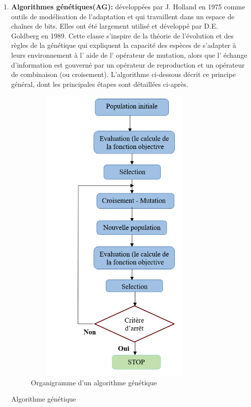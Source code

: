 \begin{enumerate}[label=\alph*)]
	\item \textbf{Algorithmes génétiques(AG):} développées par J. Holland en 1975 comme outils de modélisation de l’adaptation et qui travaillent dans un espace de chaînes de bits. Elles ont été largement utilisé et développé par D.E. Goldberg en 1989. Cette classe s’inspire de la théorie de l’évolution et des règles de la génétique qui expliquent la capacité des espèces de s’adapter à leurs environnement à l’ aide de l’ opérateur de mutation, alors que l’ échange               	d’information est gouverné par un opérateur de reproduction et un opérateur de combinaison (ou croisement). L’algorithme ci-dessous décrit ce principe général, dont les principales étapes sont détaillées ci-après.\\

\begin{figure}[H]
	\centering
	\includegraphics[width=9cm,height=15cm]{Chap3/6.png}
	\caption{Organigramme d’un algorithme génétique}
	\label{fig:CSF}
\end{figure}

\begin{algorithm}[H]
\caption{Algorithme génétique}
\SetAlgoLined
\DontPrintSemicolon


\end{algorithm}
\end{enumerate}
